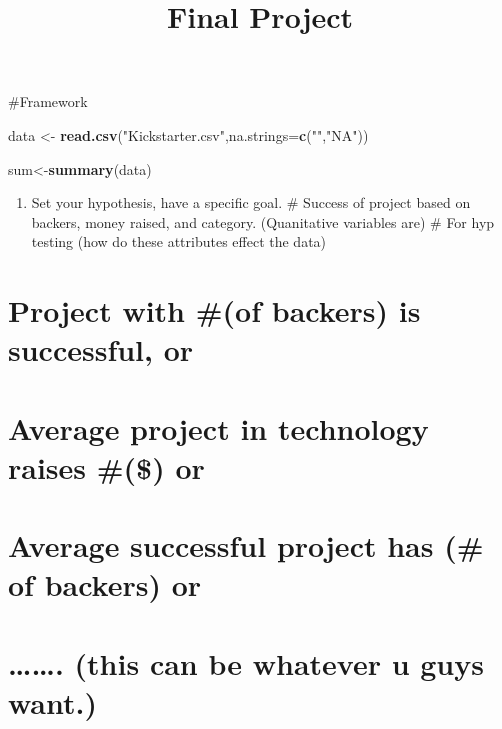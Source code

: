 \documentclass[
]{article}
\title{Final Project}
\author{}
\date{\vspace{-2.5em}}
\newenvironment{Shaded}{\begin{snugshade}}{\end{snugshade}}
\newcommand{\DataTypeTok}[1]{\textcolor[rgb]{0.13,0.29,0.53}{#1}}
\newcommand{\KeywordTok}[1]{\textcolor[rgb]{0.13,0.29,0.53}{\textbf{#1}}}
\newcommand{\NormalTok}[1]{#1}
\newcommand{\StringTok}[1]{\textcolor[rgb]{0.31,0.60,0.02}{#1}}
\providecommand{\tightlist}{%
  \setlength{\itemsep}{0pt}\setlength{\parskip}{0pt}}
\begin{document}
\maketitle

\#Framework

\begin{Shaded}
\begin{Highlighting}[]
\NormalTok{data <-}\StringTok{ }\KeywordTok{read.csv}\NormalTok{(}\StringTok{"Kickstarter.csv"}\NormalTok{,}\DataTypeTok{na.strings=}\KeywordTok{c}\NormalTok{(}\StringTok{""}\NormalTok{,}\StringTok{"NA"}\NormalTok{))}

\NormalTok{sum<-}\KeywordTok{summary}\NormalTok{(data)}
\end{Highlighting}
\end{Shaded}

\begin{enumerate}
\def\labelenumi{\arabic{enumi})}
\tightlist
\item
  Set your hypothesis, have a specific goal. \# Success of project based
  on backers, money raised, and category. (Quanitative variables are) \#
  For hyp testing (how do these attributes effect the data)
\end{enumerate}

\hypertarget{project-with-of-backers-is-successful-or}{%
\section{Project with \#(of backers) is successful,
or}\label{project-with-of-backers-is-successful-or}}

\hypertarget{average-project-in-technology-raises-or}{%
\section{Average project in technology raises \#(\$)
or}\label{average-project-in-technology-raises-or}}

\hypertarget{average-successful-project-has-of-backers-or}{%
\section{Average successful project has (\# of backers)
or}\label{average-successful-project-has-of-backers-or}}

\hypertarget{this-can-be-whatever-u-guys-want.}{%
\section{\ldots\ldots. (this can be whatever u guys
want.)}\label{this-can-be-whatever-u-guys-want.}}
\end{document}
